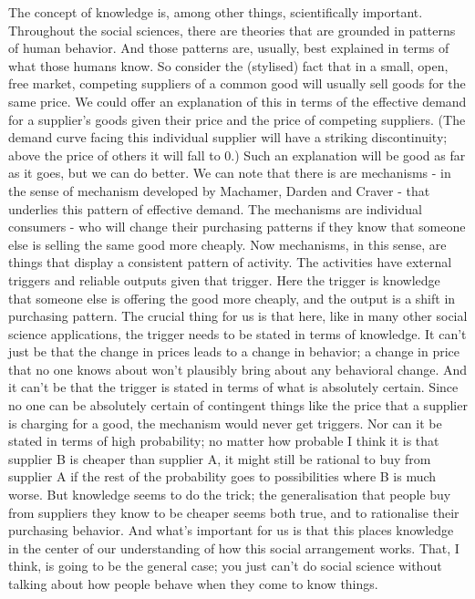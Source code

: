 \documentclass[
  11pt,
]{book}
\begin{document}
The concept of knowledge is, among other things, scientifically important. Throughout the social sciences, there are theories that are grounded in patterns of human behavior. And those patterns are, usually, best explained in terms of what those humans know. So consider the (stylised) fact that in a small, open, free market, competing suppliers of a common good will usually sell goods for the same price. We could offer an explanation of this in terms of the effective demand for a supplier's goods given their price and the price of competing suppliers. (The demand curve facing this individual supplier will have a striking discontinuity; above the price of others it will fall to 0.) Such an explanation will be good as far as it goes, but we can do better. We can note that there is are mechanisms - in the sense of mechanism developed by Machamer, Darden and Craver \citeyearpar{MachamerEtAl2000} - that underlies this pattern of effective demand. The mechanisms are individual consumers - who will change their purchasing patterns if they know that someone else is selling the same good more cheaply. Now mechanisms, in this sense, are things that display a consistent pattern of activity. The activities have external triggers and reliable outputs given that trigger. Here the trigger is knowledge that someone else is offering the good more cheaply, and the output is a shift in purchasing pattern. The crucial thing for us is that here, like in many other social science applications, the trigger needs to be stated in terms of knowledge. It can't just be that the change in prices leads to a change in behavior; a change in price that no one knows about won't plausibly bring about any behavioral change. And it can't be that the trigger is stated in terms of what is absolutely certain. Since no one can be absolutely certain of contingent things like the price that a supplier is charging for a good, the mechanism would never get triggers. Nor can it be stated in terms of high probability; no matter how probable I think it is that supplier B is cheaper than supplier A, it might still be rational to buy from supplier A if the rest of the probability goes to possibilities where B is much worse. But knowledge seems to do the trick; the generalisation that people buy from suppliers they know to be cheaper seems both true, and to rationalise their purchasing behavior. And what's important for us is that this places knowledge in the center of our understanding of how this social arrangement works. That, I think, is going to be the general case; you just can't do social science without talking about how people behave when they come to know things.
\end{document}
